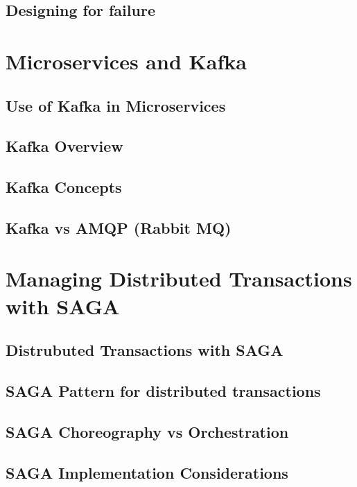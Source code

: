 \documentclass[a4paper, 11pt]{book}
\begin{document}
{    \section{Designing for failure}


    \chapter{Microservices and Kafka}


    \section{Use of Kafka in Microservices}


    \section{Kafka Overview}


    \section{Kafka Concepts}


    \section{Kafka vs AMQP (Rabbit MQ)}


    \chapter{Managing Distributed Transactions with SAGA}


    \section{Distrubuted Transactions with SAGA}


    \section{SAGA Pattern for distributed transactions}


    \section{SAGA Choreography vs Orchestration}


    \section{SAGA Implementation Considerations}


}
\end{document}
